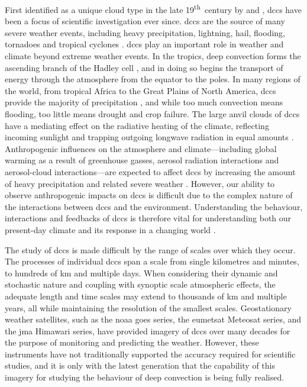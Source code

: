First identified as a unique cloud type in the late 19\textsuperscript{th}~century by \citet{abercromby_identity_1887} and \citet{hildebrandsson_remarks_1887}, \acrshort{dcc}s have been a focus of scientific investigation ever since.
\acrshort{dcc}s are the source of many severe weather events, including heavy precipitation, lightning, hail, flooding, tornadoes and tropical cyclones \citep{westra_future_2014, houze_chapter_2014, williams_radar_1992, bruning_theory_2013, punge_hail_2016, matsudo_severe_2011}.
\acrshort{dcc}s play an important role in weather and climate beyond extreme weather events.
In the tropics, deep convection forms the ascending branch of the Hadley cell \citep{riehl_heat_1958}, and in doing so begins the transport of energy through the atmosphere from the equator to the poles.
In many regions of the world, from tropical Africa to the Great Plains of North America, \acrshort{dcc}s provide the majority of precipitation \citep{feng_global_2021}, and while too much convection means flooding, too little means drought and crop failure.
The large anvil clouds of \acrshort{dcc}s have a mediating effect on the radiative heating of the climate, reflecting incoming sunlight and trapping outgoing longwave radiation in equal amounts \citep{ramanathan_cloud-radiative_1989, hartmann_effect_1992, hartmann_tropical_2016}.
Anthropogenic influences on the atmosphere and climate---including global warming as a result of greenhouse gasses, aerosol radiation interactions and aerosol-cloud interactions---are expected to affect \acrshort{dcc}s by increasing the amount of heavy precipitation and related severe weather \citep[e.g.][]{allen_constraints_2002, trenberth_changing_2003, held_robust_2006, khain2005aerosol, koren_smoke_2008, rosenfeld_flood_2008, fan_microphysical_2013, fan_review_2016}.
However, our ability to observe anthropogenic impacts on \acrshort{dcc}s is difficult due to the complex nature of the interactions between \acrshort{dcc}s and the environment.
Understanding the behaviour, interactions and feedbacks of \acrshort{dcc}s is therefore vital for understanding both our present-day climate and its response in a changing world \citep{bony_clouds_2015, sherwood_assessment_2020}.

The study of \acrshort{dcc}s is made difficult by the range of scales over which they occur.
The processes of individual \acrshort{dcc}s span a scale from single kilometres and minutes, to hundreds of km and multiple days.
When considering their dynamic and stochastic nature and coupling with synoptic scale atmospheric effects, the adequate length and time scales may extend to thousands of km and multiple years, all while maintaining the resolution of the smallest scales.
Geostationary weather satellites, such as the \acrfull{noaa} \acrfull{goes} series, the \acrfull{eumetsat} Meteosat series, and the \acrlong{jma} Himawari series, have provided imagery of \acrshort{dcc}s over many decades for the purpose of monitoring and predicting the weather.
However, these instruments have not traditionally supported the accuracy required for scientific studies, and it is only with the latest generation that the capability of this imagery for studying the behaviour of deep convection is being fully realised.

